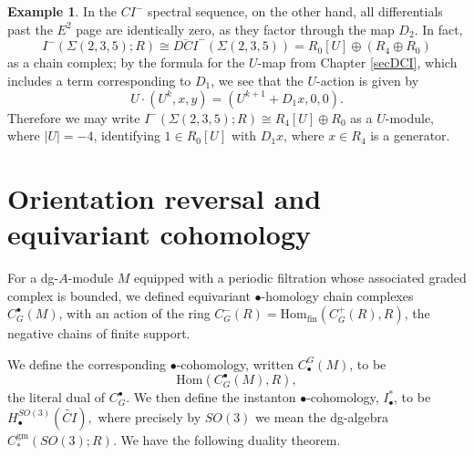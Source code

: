 \documentclass{memo-l}
\theoremstyle{definition}
\newtheorem{example}[theorem]{Example}
\theoremstyle{remark}
\numberwithin{section}{chapter}
\numberwithin{equation}{chapter}
\begin{document}
\begin{example}
In the $CI^-$ spectral sequence, on the other hand, all differentials past the $E^2$ page are identically zero, as they factor through the map $D_2$. In fact, $$I^-(\Sigma(2,3,5);R) \cong \overline{DCI}^-(\Sigma(2,3,5)) = R_0[U] \oplus (R_4 \oplus R_0)$$ as a chain complex; by the formula for the $U$-map from Chapter \ref{secDCI}, which includes a term corresponding to $D_1$, we see that the $U$-action is given by $$U \cdot (U^k, x, y) = (U^{k+1} + D_1x, 0, 0).$$ Therefore we may write $I^-(\Sigma(2,3,5);R) \cong R_4[U] \oplus R_0$ as a $U$-module, where $|U| = -4$, identifying $1 \in R_0[U]$ with $D_1 x$, where $x \in R_4$ is a generator.
\end{example}

\section{Orientation reversal and equivariant cohomology}\label{sec:ex-orrev}
For a dg-$A$-module $M$ equipped with a periodic filtration whose associated graded complex is bounded, we defined equivariant $\bullet$-homology chain complexes $C^\bullet_G(M)$, with an action of the ring $C^-_G(R) = \text{Hom}_{\text{fin}}(C^+_G(R), R)$, the negative chains of finite support.

We define the corresponding $\bullet$-cohomology, written $C_\bullet^G(M)$, to be $$\text{Hom}(C^\bullet_G(M), R),$$ the literal dual of $C^\bullet_G$. We then define the instanton $\bullet$-cohomology, $I_\bullet^*$, to be $H_\bullet^{SO(3)}(\widetilde{CI}),$ where precisely by $SO(3)$ we mean the dg-algebra $C_*^{\text{gm}}(SO(3);R)$. We have the following duality theorem.
\end{document}

